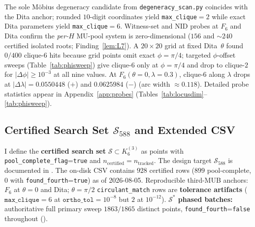 \documentclass[onecolumn]{IEEEtran}
\begin{document}
The sole M\"obius degeneracy candidate from \texttt{degeneracy\_scan.py} coincides with the Dita anchor; rounded $10$-digit coordinates yield \texttt{max\_clique}$=2$ while exact Dita parameters yield \texttt{max\_clique}$=6$.
Witness-set and NID probes at $F_6$ and Dita confirm the \emph{per-$H$} MU-pool system is zero-dimensional ($156$ and $\sim240$ certified isolated roots; Finding~\ref{lem:L7}).
A $20\times20$ grid at fixed Dita~$\theta$ found $0/400$ clique-$6$ hits because grid points omit exact $\phi=\pi/4$; targeted $\phi$-offset sweeps (Table~\ref{tab:phisweep}) give clique-$6$ only at $\phi=\pi/4$ and drop to clique-$2$ for $|\Delta\phi|\ge10^{-3}$ at all nine values.
At $F_6(\theta{=}0,\lambda{=}0.3)$, clique-$6$ along $\lambda$ drops at $|\Delta\lambda|{=}0.0550448$ ($+$) and $0.0625984$ ($-$) (arc width $\approx0.118$).
Detailed probe statistics appear in Appendix~\ref{app:probes} (Tables~\ref{tab:locusdim}--\ref{tab:phisweep}).

\subsection{Certified Search Set \texorpdfstring{$\mathcal{S}_{588}$}{S588} and Extended CSV}
I define the \textbf{certified search set} $\mathcal{S}\subset K_6^{(3)}$ as points with \texttt{pool\_complete\_flag}=\texttt{true} and $n_{\text{certified}} = n_{\text{tracked}}$.
The design target $\mathcal{S}_{588}$ is documented in .
The on-disk CSV  contains $928$ certified rows ($899$ pool-complete, $0$ with \texttt{found\_fourth}=\texttt{true}) as of 2026-08-05.
Reproducible third-MUB anchors: $F_6$ at $\theta=0$ and Dita; $\theta=\pi/2$ \texttt{circulant\_match} rows are \textbf{tolerance artifacts} ($\texttt{max\_clique}=6$ at $\texttt{ortho\_tol}=10^{-8}$ but $2$ at $10^{-12}$).
\textbf{$\mathcal{S}^*$ phased batches:} authoritative full primary sweep $1863/1865$ distinct points, \texttt{found\_fourth}=\texttt{false} throughout ().
\end{document}
